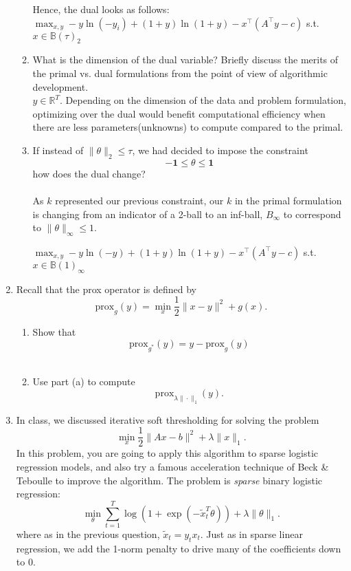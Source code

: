 \documentclass[12pt]{amsart}
\newcommand{\prox}{\mathrm{prox}}
\begin{document}
\begin{enumerate}
\begin{enumerate}
\noindent
Hence, the dual looks as follows:\\
$\displaystyle \max_{x,y} -y \ln(-y_i) + (1+y)\ln(1+y) - x^\top (A^\top y - c)$ s.t. $x \in \mathbb{B}(\tau)_2$\\


\item  What is the dimension of the dual variable? Briefly discuss the merits of the primal vs. dual 
formulations from the point of view of algorithmic development. \\

\noindent 
$y \in \mathbb{R}^T$. Depending on the dimension of the data and problem formulation, optimizing over the dual would benefit computational efficiency when there are less parameters(unknowns) to compute compared to the primal.\\


\item  If instead of $\|\theta\|_2 \leq \tau$, we had decided to impose the constraint 
  \[
- \mathbf{1} \leq \theta \leq \mathbf{1}
 \]
 how does the dual change? \\\\

\noindent
As $k$ represented our previous constraint, our $k$ in the primal formulation is changing from an indicator of a 2-ball to an inf-ball, $B_\infty$ to correspond to $\|\theta\|_\infty \leq 1$.


$\displaystyle \max_{x,y} -y \ln(-y) + (1+y)\ln(1+y) - x^\top (A^\top y - c)$ s.t. $x \in \mathbb{B}(1)_\infty$ \\


\end{enumerate}

\item Recall that the prox operator is defined by 
\[
\prox_g(y) = \min_x \frac{1}{2}\|x - y\|^2 + g(x).
\]
\begin{enumerate}

\item 
Show  that 
\[
\prox_{g^*} (y) = y - \prox_g(y)
\]
\\
\item Use part (a) to compute 
\[
\prox_{\lambda \|\cdot\|_1}(y).
\]

\end{enumerate}
\newpage

\item 

In class, we discussed iterative soft thresholding for solving the problem 
\[
\min_x \frac{1}{2} \|Ax - b\|^2 + \lambda \|x\|_1. 
\]
In this problem, you are going to apply this algorithm to sparse logistic regression models, 
and also try a famous acceleration technique of Beck \& Teboulle to improve the algorithm. 
The problem is {\it sparse} binary logistic regression: 
\[
\min_{\theta} \sum_{t = 1}^T \log(1 + \exp(-\tilde x_t^T\theta))  + \lambda \|\theta\|_1.
\]
where as in the previous question, $\tilde x_t = y_t x_t$. Just as in sparse linear regression, 
we add the 1-norm penalty to drive many of the coefficients down to $0$.



\end{enumerate}
\end{document}
